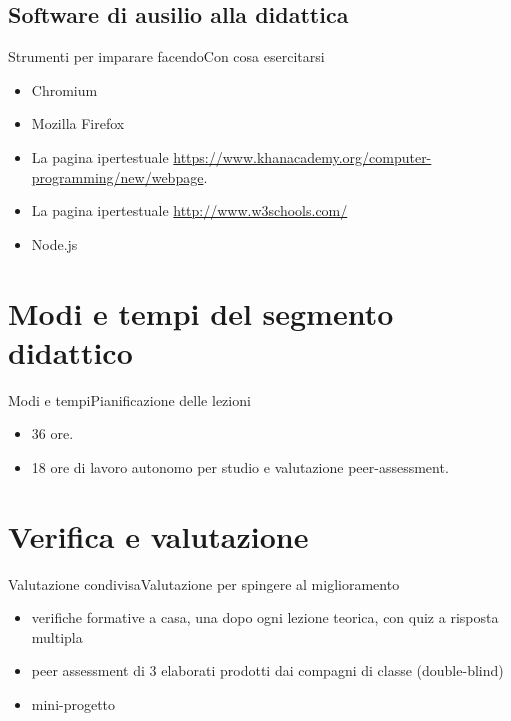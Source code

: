 \documentclass[italian]{beamer}
\begin{document}
\subsection[Strumenti\ldots]{Software di ausilio alla didattica}
\begin{frame}{Strumenti per imparare facendo}{Con cosa esercitarsi}
	\begin{itemize}
		\item Chromium
		
		\item Mozilla Firefox
		
		\item La pagina ipertestuale \hyperlink{https://www.khanacademy.org/computer-programming/new/webpage}{https://www.khanacademy.org/computer-programming/new/webpage}.
		
		\item La pagina ipertestuale \hyperlink{http://www.w3schools.com/}{http://www.w3schools.com/}
		
		\item Node.js
	\end{itemize}
	\note{%
		
	}%
\end{frame}

\section[Modi e tempi]{Modi e tempi del segmento didattico}
\begin{frame}{Modi e tempi}{Pianificazione delle lezioni}
	
	\begin{itemize}
		\item 36 ore.
		\item 18 ore di lavoro autonomo per studio e valutazione peer-assessment.		
	\end{itemize}
	\medskip
	\medskip
\end{frame}


\section[Verifica e valutazione]{Verifica e valutazione}
\begin{frame}{Valutazione condivisa}{Valutazione per spingere al miglioramento}
	
	\begin{itemize}
		\item verifiche formative a casa, una dopo ogni lezione teorica, con quiz a risposta multipla
		\item peer assessment di 3 elaborati prodotti dai compagni di classe (double-blind)
		\item mini-progetto
	\end{itemize}
	
	\note{%
		
	}%
\end{frame}
\end{document}
